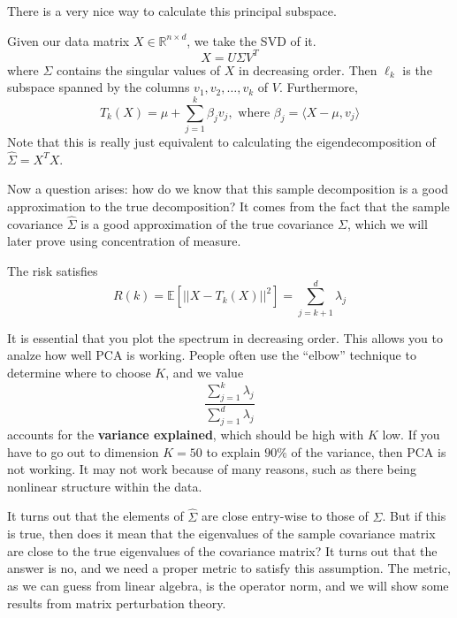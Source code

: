 \documentclass{article}
\begin{document}
    There is a very nice way to calculate this principal subspace. 

    \begin{theorem} 
      Given our data matrix $X \in \mathbb{R}^{n \times d}$, we take the SVD of it. 
      \begin{equation}
        X = U \Sigma V^T
      \end{equation}
      where $\Sigma$ contains the singular values of $X$ in decreasing order. Then $\ell_k$ is the subspace spanned by the columns $v_1, v_2, \ldots, v_k$ of $V$. Furthermore, 
      \begin{equation}
        T_k (X) = \mu + \sum_{j=1}^k \beta_j v_j , \text{ where } \beta_j = \langle X - \mu, v_j \rangle
      \end{equation}
      Note that this is really just equivalent to calculating the eigendecomposition of $\hat{\Sigma} = X^T X$. 
    \end{theorem}

    Now a question arises: how do we know that this sample decomposition is a good approximation to the true decomposition? It comes from the fact that the sample covariance $\hat{\Sigma}$ is a good approximation of the true covariance $\Sigma$, which we will later prove using concentration of measure. 

    \begin{theorem}[Risk]
      The risk satisfies 
      \begin{equation}
        R(k) = \mathbb{E}[|| X - T_k (X) ||^2 ] = \sum_{j=k+1}^d \lambda_j 
      \end{equation}
    \end{theorem}

    It is essential that you plot the spectrum in decreasing order. This allows you to analze how well PCA is working. People often use the ``elbow'' technique to determine where to choose $K$, and we value 
    \begin{equation}
      \frac{\sum_{j=1}^k \lambda_j}{\sum_{j=1}^d \lambda_j} 
    \end{equation}
    accounts for the \textbf{variance explained}, which should be high with $K$ low. If you have to go out to dimension $K=50$ to explain $90\%$ of the variance, then PCA is not working. It may not work because of many reasons, such as there being nonlinear structure within the data. 

    It turns out that the elements of $\hat{\Sigma}$ are close entry-wise to those of $\Sigma$. But if this is true, then does it mean that the eigenvalues of the sample covariance matrix are close to the true eigenvalues of the covariance matrix? It turns out that the answer is no, and we need a proper metric to satisfy this assumption. The metric, as we can guess from linear algebra, is the operator norm, and we will show some results from matrix perturbation theory. 
\end{document}
